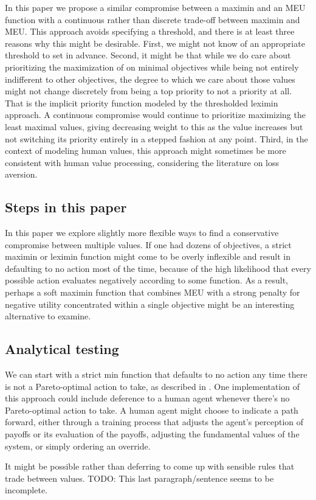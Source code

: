 In this paper we propose a similar compromise between a maximin and an MEU function with a continuous rather than discrete trade-off between maximin and MEU. This approach avoids specifying a threshold, and there is at least three reasons why this might be desirable. First, we might not know of an appropriate threshold to set in advance. Second, it might be that while we do care about prioritizing the maximization of on minimal objectives while being not entirely indifferent to other objectives, the degree to which we care about those values might not change discretely from being a top priority to not a priority at all. That is the implicit priority function modeled by the thresholded leximin approach. A continuous compromise would continue to prioritize maximizing the least maximal values, giving decreasing weight to this as the value increases but not switching its priority entirely in a stepped fashion at any point. Third, in the context of modeling human values, this approach might sometimes be more consistent with human value processing, considering the literature on loss aversion.

\subsection{Steps in this paper}

In this paper we explore slightly more flexible ways to find a conservative compromise between multiple values. If one had dozens of objectives, a strict maximin or leximin function might come to be overly inflexible and result in defaulting to no action most of the time, because of the high likelihood that every possible action evaluates negatively according to some function. As a result, perhaps a soft maximin function that combines MEU with a strong penalty for negative utility concentrated within a single objective might be an interesting alternative to examine.

 
\subsection{Analytical testing}

We can start with a strict min function that defaults to no action any time there is not a Pareto-optimal action to take, as described in \cite{vamplew_human-aligned_2018}. One implementation of this approach could include  deference to a human agent whenever there's no Pareto-optimal action to take. A human agent might choose to indicate a path forward, either through a training process that adjusts the agent's perception of payoffs or its evaluation of the payoffs, adjusting the fundamental values of the system, or simply ordering an override.

It might be possible rather than deferring to come up with sensible rules that trade between values.
TODO: This last paragraph/sentence seems to be incomplete.

